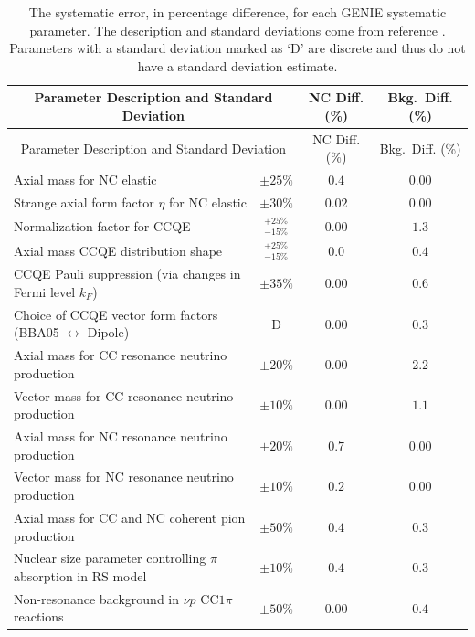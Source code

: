 \singlespacing
\begin{longtable}{p{3.25in} c c c}
  \caption[GENIE Systematic Errors]{The systematic error, in percentage difference, for each GENIE systematic parameter. The description and standard deviations come from reference \cite{ref:GENIE, ref:TNGENIE}. Parameters with a standard deviation marked as `D' are discrete and thus do not have a standard deviation estimate.} \tabularnewline
  \hline\hline
  \multicolumn{2}{c}{Parameter Description and Standard Deviation} & NC Diff. (\%) & Bkg.~Diff. (\%) \\
  \hline \endfirsthead
  \hline\hline
  \multicolumn{2}{c}{Parameter Description and Standard Deviation} & NC Diff. (\%) & Bkg.~Diff. (\%) \\
  \hline \endhead
  Axial mass for NC elastic & $\pm25\%$ & $0.4$ & $0.00$ \\
  Strange axial form factor $\eta$ for NC elastic & $\pm30\%$ & $0.02$ & $0.00$ \\
  Normalization factor for CCQE & $^{+25\%}_{-15\%}$ & $0.00$ & $1.3$ \\
  Axial mass CCQE distribution shape & $^{+25\%}_{-15\%}$ & $0.0$ & $0.4$ \\
  CCQE Pauli suppression (via changes in Fermi level $k_F$) & $\pm35\%$ & $0.00$ & $0.6$ \\
  Choice of CCQE vector form factors \newline (BBA05 $\leftrightarrow$ Dipole) & D & $0.00$ & $0.3$ \\
  Axial mass for CC resonance neutrino production & $\pm20\%$ & $0.00$ & $2.2$ \\
  Vector mass for CC resonance neutrino \newline production & $\pm10\%$ & $0.00$ & $1.1$ \\
  Axial mass for NC resonance neutrino production & $\pm20\%$ & $0.7$ & $0.00$ \\
  Vector mass for NC resonance neutrino production & $\pm10\%$ & $0.2$ & $0.00$ \\
  Axial mass for CC and NC coherent pion \newline production & $\pm50\%$ & $0.4$ & $0.3$ \\
  Nuclear size parameter controlling $\pi$ absorption \newline in RS model & $\pm10\%$ & $0.4$ & $0.3$ \\
  Non-resonance background in $\nu p$ CC$1\pi$ reactions & $\pm50\%$ & $0.00$ & $0.4$ \\

\end{longtable}
